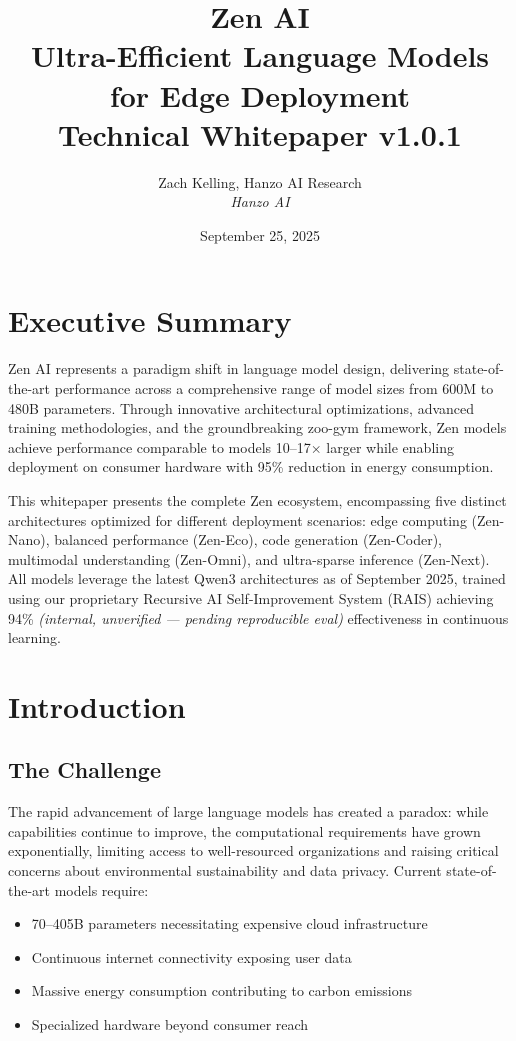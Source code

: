 \documentclass[11pt,a4paper]{article}
\title{
    \vspace{-2cm}
    \Large \textbf{Zen AI} \\
    \vspace{0.5cm}
    \Huge \textbf{Ultra-Efficient Language Models for Edge Deployment} \\
    \vspace{0.5cm}
    \normalsize Technical Whitepaper v1.0.1
}
\author{Zach Kelling, Hanzo AI Research\\
\textit{Hanzo AI}}
\date{September 25, 2025}
\begin{document}
\maketitle

\section*{Executive Summary}

Zen AI represents a paradigm shift in language model design, delivering
state-of-the-art performance across a comprehensive range of model sizes from
600M to 480B parameters. Through innovative architectural optimizations, advanced
training methodologies, and the groundbreaking zoo-gym framework, Zen models
achieve performance comparable to models 10--17$\times$ larger while enabling
deployment on consumer hardware with 95\% reduction in energy consumption.

This whitepaper presents the complete Zen ecosystem, encompassing five distinct
architectures optimized for different deployment scenarios: edge computing
(Zen-Nano), balanced performance (Zen-Eco), code generation (Zen-Coder),
multimodal understanding (Zen-Omni), and ultra-sparse inference (Zen-Next). All
models leverage the latest Qwen3 architectures as of September 2025, trained
using our proprietary Recursive AI Self-Improvement System (RAIS) achieving 94\% \textit{(internal, unverified --- pending reproducible eval)}
effectiveness in continuous learning.

\tableofcontents
\newpage

\section{Introduction}

\subsection{The Challenge}

The rapid advancement of large language models has created a paradox: while
capabilities continue to improve, the computational requirements have grown
exponentially, limiting access to well-resourced organizations and raising
critical concerns about environmental sustainability and data privacy. Current
state-of-the-art models require:

\begin{itemize}
    \item 70--405B parameters necessitating expensive cloud infrastructure
    \item Continuous internet connectivity exposing user data
    \item Massive energy consumption contributing to carbon emissions
    \item Specialized hardware beyond consumer reach
\end{itemize}
\end{document}
